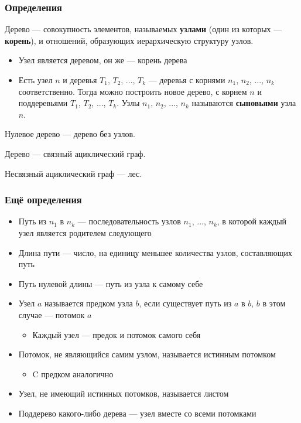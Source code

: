 \documentclass[xetex,mathserif,serif]{beamer}
\begin{document}
	\begin{frame}
		\frametitle{Определения}
		Дерево --- совокупность элементов, называемых \textbf{узлами} (один из которых --- \textbf{корень}), и отношений, образующих иерархическую структуру узлов.
		\begin{itemize}
			\item Узел является деревом, он же --- корень дерева
			\item Есть узел $n$ и деревья $T_1$, $T_2$, ..., $T_k$ --- деревья с корнями $n_1$, $n_2$, ..., $n_k$ соответственно. Тогда можно построить новое дерево, с корнем $n$ и поддеревьями $T_1$, $T_2$, ..., $T_k$. Узлы $n_1$, $n_2$, ..., $n_k$ называются \textbf{сыновьями} узла $n$.
		\end{itemize}
		Нулевое дерево --- дерево без узлов.

		Дерево --- связный ациклический граф.

		Несвязный ациклический граф --- лес.
	\end{frame}

	\begin{frame}
		\frametitle{Ещё определения}
		\begin{itemize}
			\item Путь из $n_1$ в $n_k$ --- последовательность узлов $n_1$, ..., $n_k$, в которой каждый узел является родителем следующего
			\item Длина пути --- число, на единицу меньшее количества узлов, составляющих путь
			\item Путь нулевой длины --- путь из узла к самому себе
			\item Узел $a$ называется предком узла $b$, если существует путь из $a$ в $b$, $b$ в этом случае --- потомок $a$
			\begin{itemize}
				\item Каждый узел --- предок и потомок самого себя
			\end{itemize}
			\item Потомок, не являющийся самим узлом, называется истинным потомком
			\begin{itemize}
				\item C предком аналогично
			\end{itemize}
			\item Узел, не имеющий истинных потомков, называется листом
			\item Поддерево какого-либо дерева --- узел вместе со всеми потомками
		\end{itemize}
	\end{frame}
\end{document}
